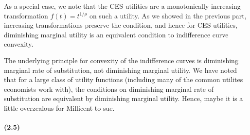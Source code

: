 \documentclass[10pt,letter]{article}
\begin{document}
As a special case, we note that the CES utilities are a monotonically increasing transformation $f(t) = t^{1/\rho}$ on such a utility. As we showed in the previous part, increasing transformations preserve the condition, and hence for CES utilities, diminishing marginal utility is an equivalent condition to indifference curve convexity.

The underlying principle for convexity of the indifference curves is diminishing marginal rate of substitution, not diminishing marginal utility. We have noted that for a large class of utility functions (including many of the common utilites economists work with), the conditions on diminishing marginal rate of substitution are equivalent by diminishing marginal utility. Hence, maybe it is a little overzealous for Millicent to sue.
\paragraph{(2.5)}
\end{document}

